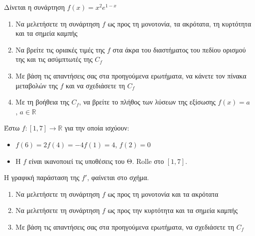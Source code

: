 \documentclass{presentation}
\begin{document}
\begin{askisi}
  Δίνεται η συνάρτηση $f(x)=x^2e^{1-x}$
  \begin{enumerate}[<+->]
    \item Να μελετήσετε τη συνάρτηση $f$ ως προς τη μονοτονία, τα ακρότατα, τη κυρτότητα και τα σημεία καμπής
    \item Να βρείτε τις οριακές τιμές της $f$ στα άκρα του διαστήματος του πεδίου ορισμού της και τις ασύμπτωτές της $C_f$
    \item Με βάση τις απαντήσεις σας στα προηγούμενα ερωτήματα, να κάνετε τον πίνακα μεταβολών της $f$ και να σχεδιάσετε τη $C_f$
    \item Με τη βοήθεια της $C_f$, να βρείτε το πλήθος των λύσεων της εξίσωσης $f(x)=a$, $a\in\mathbb{R}$
  \end{enumerate}
\end{askisi}

\begin{askisi}
  Έστω $f:[1,7]\to\mathbb{R}$ για την οποία ισχύουν:
  \begin{itemize}
    \item $f(6)=2f(4)=-4f(1)=4$, $f(2)=0$
    \item Η $f$ είναι ικανοποιεί τις υποθέσεις του Θ. Rolle στο $[1,7]$.
  \end{itemize}
  Η γραφική παράσταση της $f'$, φαίνεται στο σχήμα.
  \begin{enumerate}[<+->]
    \item Να μελετήσετε τη συνάρτηση $f$ ως προς τη μονοτονία και τα ακρότατα
    \item Να μελετήσετε τη συνάρτηση $f$ ως προς την κυρτότητα και τα σημεία καμπής
    \item Με βάση τις απαντήσεις σας στα προηγούμενα ερωτήματα, να σχεδιάσετε τη $C_f$
  \end{enumerate}
\end{askisi}

\moodle
\end{document}
